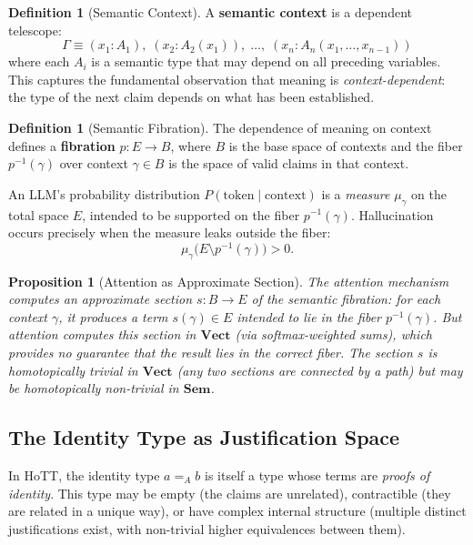 \documentclass[11pt,a4paper]{article}
\theoremstyle{plain}
\newtheorem{proposition}[theorem]{Proposition}
\theoremstyle{definition}
\newtheorem{definition}[theorem]{Definition}
\newcommand{\Sem}{\mathbf{Sem}}
\newcommand{\Vect}{\mathbf{Vect}}
\begin{document}
\begin{definition}[Semantic Context]\label{def:ctx}
A \textbf{semantic context} is a dependent telescope:
\[
  \Gamma \equiv (x_1 : A_1),\; (x_2 : A_2(x_1)),\; \ldots,\; (x_n : A_n(x_1, \ldots, x_{n-1}))
\]
where each $A_i$ is a semantic type that may depend on all preceding variables. This captures the fundamental observation that meaning is \emph{context-dependent}: the type of the next claim depends on what has been established.
\end{definition}

\begin{definition}[Semantic Fibration]\label{def:fibration}
The dependence of meaning on context defines a \textbf{fibration} $p\colon E \to B$, where $B$ is the base space of contexts and the fiber $p^{-1}(\gamma)$ over context $\gamma \in B$ is the space of valid claims in that context.

An LLM's probability distribution $P(\text{token} \mid \text{context})$ is a \emph{measure} $\mu_\gamma$ on the total space $E$, intended to be supported on the fiber $p^{-1}(\gamma)$. Hallucination occurs precisely when the measure leaks outside the fiber:
\begin{equation}\label{eq:halluc-measure}
  \mu_\gamma\bigl(E \setminus p^{-1}(\gamma)\bigr) > 0.
\end{equation}
\end{definition}

\begin{proposition}[Attention as Approximate Section]\label{prop:attention-section}
The attention mechanism computes an approximate section $s\colon B \to E$ of the semantic fibration: for each context $\gamma$, it produces a term $s(\gamma) \in E$ intended to lie in the fiber $p^{-1}(\gamma)$. But attention computes this section in $\Vect$ (via softmax-weighted sums), which provides no guarantee that the result lies in the correct fiber. The section $s$ is homotopically trivial in $\Vect$ (any two sections are connected by a path) but may be homotopically non-trivial in $\Sem$.
\end{proposition}

\subsection{The Identity Type as Justification Space}

In HoTT, the identity type $a =_A b$ is itself a type whose terms are \emph{proofs of identity}. This type may be empty (the claims are unrelated), contractible (they are related in a unique way), or have complex internal structure (multiple distinct justifications exist, with non-trivial higher equivalences between them).
\end{document}
